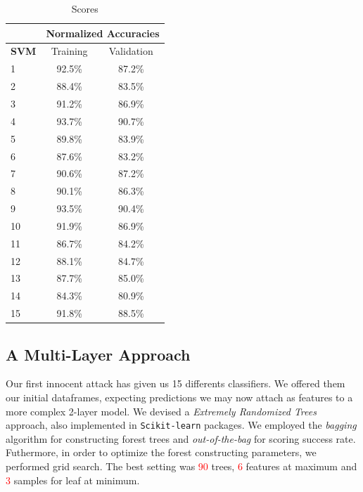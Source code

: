 \documentclass[10pt,twocolumn,letterpaper]{article}
\begin{document}
\begin{table}[H]
\begin{center}
\caption{Scores}
\begin{tabular}{|l|*2{c|}}
\hline
 				& \multicolumn{2}{c|}{Normalized Accuracies} \\ \hline
 				
\textbf{SVM}	& Training  & Validation \\ \hline
1				& 92.5\% 	& 87.2\%	 \\ 
2				& 88.4\%	& 83.5\%	 \\ 	
3				& 91.2\%	& 86.9\%	 \\ 
4				& 93.7\%	& 90.7\%	 \\ 
5				& 89.8\%	& 83.9\%	 \\ 
6				& 87.6\%	& 83.2\%	 \\ 
7				& 90.6\%	& 87.2\%	 \\
8				& 90.1\%	& 86.3\%	 \\ 
9				& 93.5\%	& 90.4\%	 \\ 
10				& 91.9\%	& 86.9\%	 \\ 
11				& 86.7\%	& 84.2\%	 \\ 
12				& 88.1\%	& 84.7\%	 \\ 
13				& 87.7\%	& 85.0\%	 \\ 
14				& 84.3\%	& 80.9\%	 \\ 
15 				& 91.8\%	& 88.5\%	 \\ \hline
\end{tabular}
\end{center}
\end{table}

\subsection{A Multi-Layer Approach}

Our first innocent attack has given us 15 differents classifiers. We offered
them our initial dataframes, expecting predictions we
may now attach as features to a more complex 2-layer model. We devised a
\emph{Extremely Randomized Trees} \cite{Geurts} approach, also
implemented in \texttt{Scikit-learn} packages. We employed the \emph{bagging} algorithm for constructing forest trees
and \emph{out-of-the-bag} for scoring success rate. Futhermore, in order to
optimize the forest constructing parameters, we performed grid search. The best
setting was \textcolor{red}{90} trees, \textcolor{red}{6} features at maximum
and \textcolor{red}{3} samples for leaf at minimum. 
\end{document}
